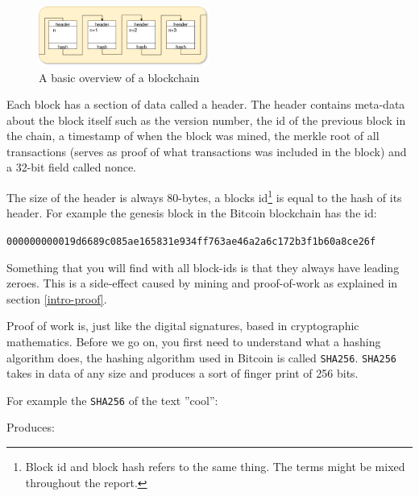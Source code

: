 \begin{figure}[H]
	\centering
	\includegraphics[width=0.5\textwidth]{introduction/images/blockchain.png}
	\caption{A basic overview of a blockchain}
	\label{fig:blockchain}
\end{figure}

Each block has a section of data called a header. The header contains meta-data 
about the block itself such as the version number, the id of the previous block 
in the chain, a timestamp of when the block was mined, the merkle root of 
all transactions (serves as proof of what transactions was included in the block) 
and a 32-bit field called nonce. 

The size of the header is always 80-bytes, a blocks id\footnote{Block id and 
block hash refers to the same thing. The terms might be mixed throughout the report.} 
is equal to the hash of its header. For example the genesis block in the 
Bitcoin blockchain has the id:

\texttt{000000000019d6689c085ae165831e934ff763ae46a2a6c172b3f1b60a8ce26f}

Something that you will find with all block-ids is that they always have leading zeroes. 
This is a side-effect  caused by mining and proof-of-work as explained in section \ref{intro-proof}.

\label{intro-proof}
Proof of work is, just like the digital signatures, based in cryptographic
mathematics. Before we go on, you first need to understand what a hashing
algorithm does, the hashing algorithm used in Bitcoin is called \texttt{SHA256}.
\texttt{SHA256} takes in data of any size and produces a sort of finger print
of 256 bits.

For example the \texttt{SHA256} of the text ''cool'':


Produces:


